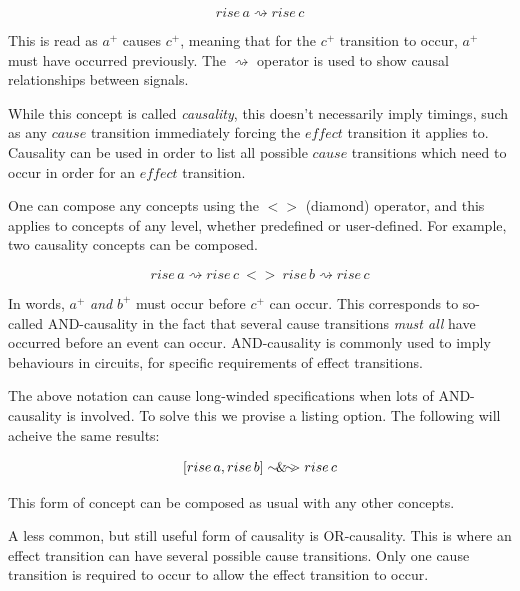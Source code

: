 \documentclass[british,conference,compsoc]{IEEEtran}
\begin{document}
\[
rise\,a\rightsquigarrow rise\,c
\]

\vspace{-1mm}

This is read as $a^{+}$ causes $c^{+}$, meaning that for the $c^{+}$ transition 
to occur, $a^{+}$ must have occurred previously. The $\rightsquigarrow$ 
operator is used to show causal relationships between signals.
 
While this concept is called \emph{causality}, this doesn't necessarily imply
timings, such as any $\mathit{cause}$ transition immediately forcing the
 $\mathit{effect}$ transition it applies to. Causality can be used in order to
list all possible $\mathit{cause}$ transitions which need to occur in order
 for an $\mathit{effect}$ transition.

One can compose any concepts using the $<>$ (diamond) operator, and this applies
to concepts of any level, whether predefined or user-defined. For example, 
two causality concepts can be composed.

\vspace{-3mm}

\[
rise\,a\rightsquigarrow rise\,c\ <> \ rise\,b\rightsquigarrow rise\,c
\]

\vspace{-1mm}

In words, $a^{+}$ \emph{and} $b^{+}$ must occur before $c^{+}$ can occur. 
This corresponds to so-called AND-causality in the fact that several cause 
transitions \emph{must all} have occurred before an event can occur. 
AND-causality is commonly used to imply behaviours in circuits, for specific 
requirements of effect transitions.  

The above notation can cause long-winded specifications when lots of 
AND-causality is involved. To solve this we provise a listing option. The 
following will acheive the same results:

\vspace{-3mm}

\[
[rise\,a, rise\,b]\sim\hspace{-1.5mm}\&\hspace{-1.5mm}\sim\hspace{-1.5mm}>rise\,c
\]

\vspace{-1mm}

This form of concept can be composed as usual with any other concepts.

A less common, but still useful form of causality is OR-causality. This is 
where an effect transition can have several possible cause transitions. Only 
one cause transition is required to occur to allow the effect transition to 
occur. 
\end{document}
